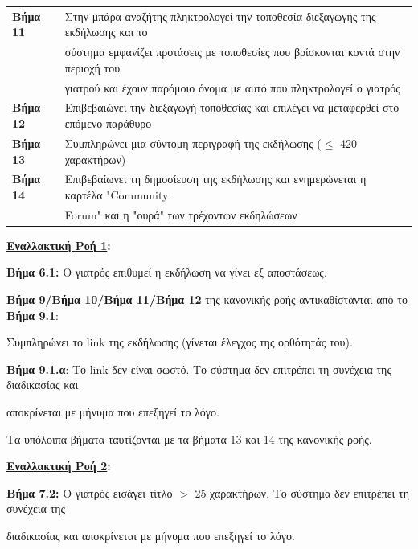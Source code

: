 \documentclass{article}
\newcommand\T{\rule{0pt}{2.6ex}}       %
\newcommand\B{\rule[-1.2ex]{0pt}{0pt}}
\begin{document}
\begin{center}
\begin{tabular}{|l|l|}
      \hline
       \textbf{Βήμα 11} & Στην μπάρα αναζήτης πληκτρολογεί την τοποθεσία διεξαγωγής της εκδήλωσης και το \T \\& σύστημα εμφανίζει προτάσεις με τοποθεσίες που βρίσκονται κοντά στην περιοχή του \\& γιατρού και έχουν παρόμοιο όνομα με αυτό που πληκτρολογεί ο γιατρός  \B \\
      \hline
       \textbf{Βήμα 12} & Επιβεβαιώνει την διεξαγωγή τοποθεσίας και επιλέγει να μεταφερθεί στο επόμενο παράθυρο\T\B \\
      \hline
       \textbf{Βήμα 13} & Συμπληρώνει μια σύντομη περιγραφή της εκδήλωσης ($\le$ 420 χαρακτήρων) \T\B \\
      \hline
       \textbf{Βήμα 14} & Επιβεβαίωνει τη δημοσίευση της εκδήλωσης και ενημερώνεται η καρτέλα "Community \T \\& Forum" και η "ουρά" των τρέχοντων εκδηλώσεων \B \\
      \hline
     \end{tabular}
 \end{center}
 
 \textbf{\underline{Εναλλακτική Ροή 1}:} \vspace{0.2cm}
\par \textbf{Βήμα 6.1:} Ο γιατρός επιθυμεί η εκδήλωση να γίνει εξ αποστάσεως.\vspace{0.1cm}

\textbf{Βήμα 9/Βήμα 10/Βήμα 11/Βήμα 12} της κανονικής ροής αντικαθίστανται από το \textbf{Βήμα 9.1}: \par Συμπληρώνει το link της εκδήλωσης (γίνεται έλεγχος της ορθότητάς του). \vspace{0.1cm}
\par \textbf{Βήμα 9.1.α}: Το link δεν είναι σωστό. Το σύστημα δεν επιτρέπει τη συνέχεια της διαδικασίας και \par αποκρίνεται με μήνυμα που επεξηγεί το λόγο. \vspace{0.1cm}

\par Τα υπόλοιπα βήματα ταυτίζονται με τα βήματα 13 και 14 της κανονικής ροής. \vspace{0.2cm}

\textbf{\underline{Εναλλακτική Ροή 2}:} \vspace{0.2cm}
\par \textbf{Βήμα 7.2:} Ο γιατρός εισάγει τίτλο $>$ 25 χαρακτήρων. Το σύστημα δεν επιτρέπει τη συνέχεια της \par διαδικασίας και αποκρίνεται με μήνυμα που επεξηγεί το λόγο. \vspace{0.2cm}
\end{document}
